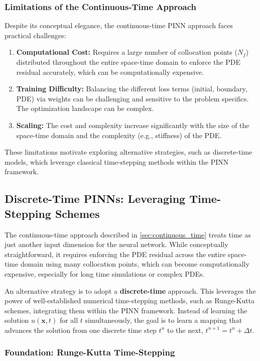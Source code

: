 \subsubsection{Limitations of the Continuous-Time Approach}

Despite its conceptual elegance, the continuous-time PINN approach faces practical challenges:
\begin{enumerate}
    \item \textbf{Computational Cost:} Requires a large number of collocation points ($N_f$) distributed throughout the entire space-time domain to enforce the PDE residual accurately, which can be computationally expensive.
    \item \textbf{Training Difficulty:} Balancing the different loss terms (initial, boundary, PDE) via weights can be challenging and sensitive to the problem specifics. The optimization landscape can be complex.
    \item \textbf{Scaling:} The cost and complexity increase significantly with the size of the space-time domain and the complexity (e.g., stiffness) of the PDE.
\end{enumerate}
These limitations motivate exploring alternative strategies, such as discrete-time models, which leverage classical time-stepping methods within the PINN framework.

\subsection{Discrete-Time PINNs: Leveraging Time-Stepping Schemes}
\label{sec:discrete_time}

The continuous-time approach described in \cref{sec:continuous_time} treats time as just another input dimension for the neural network. While conceptually straightforward, it requires enforcing the PDE residual across the entire space-time domain using many collocation points, which can become computationally expensive, especially for long time simulations or complex PDEs.

An alternative strategy is to adopt a \textbf{discrete-time} approach. This leverages the power of well-established numerical time-stepping methods, such as Runge-Kutta schemes, integrating them within the PINN framework. Instead of learning the solution $u(\mathbf{x}, t)$ for all $t$ simultaneously, the goal is to learn a mapping that advances the solution from one discrete time step $t^n$ to the next, $t^{n+1} = t^n + \Delta t$.

\subsubsection{Foundation: Runge-Kutta Time-Stepping}

